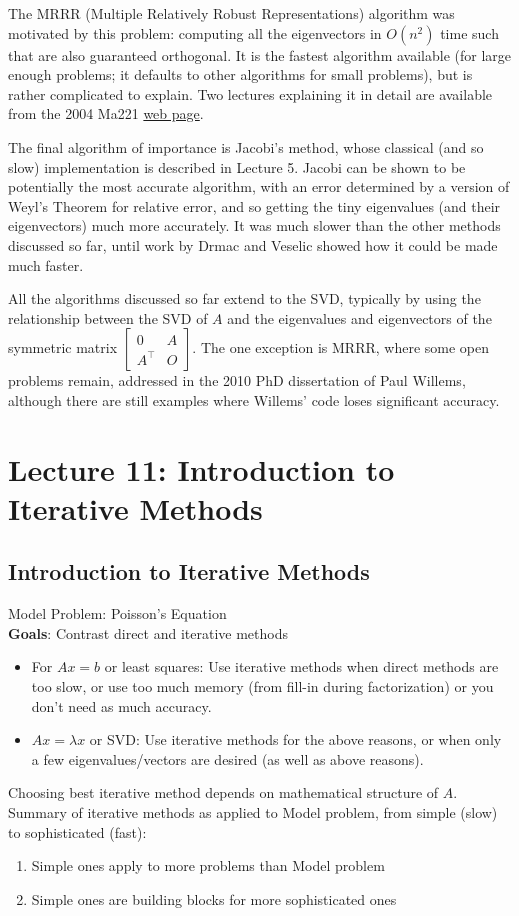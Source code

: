 \documentclass[11pt]{article}
\numberwithin{equation}{section}
\begin{document}
The MRRR (Multiple Relatively Robust Representations) algorithm was motivated by this problem: computing all the eigenvectors in $O(n^2)$ 
time such that are also guaranteed orthogonal. It is the fastest algorithm available (for large enough problems; it defaults to other algorithms for small problems), 
but is rather complicated to explain. Two lectures explaining it in detail are available from the 2004 Ma221 \href{https://people.eecs.berkeley.edu/~demmel/ma221_Fall04/}{web page}.

The final algorithm of importance is Jacobi's method, whose classical (and so slow) implementation is described in Lecture 5.
Jacobi can be shown to be potentially the most accurate algorithm, with an error determined by a version of Weyl's Theorem for relative error,
and so getting the tiny eigenvalues (and their eigenvectors) much more accurately. It was much slower than the other methods discussed so far, 
until work by Drmac and Veselic showed how it could be made much faster.

All the algorithms discussed so far extend to the SVD, typically by using the relationship between the SVD of $A$ and the eigenvalues and eigenvectors of the
symmetric matrix $\left[\begin{array}{cc}
    0 & A\\
    A^{\top} & O
    \end{array}\right]$. The one exception is MRRR, where some open problems remain, addressed in the 2010 PhD dissertation of Paul Willems,
although there are still examples where Willems’ code loses significant accuracy.

\newpage
\section{Lecture 11: Introduction to Iterative Methods}
\subsection{Introduction to Iterative Methods}
Model Problem: Poisson's Equation \\
\textbf{Goals}: Contrast direct and iterative methods
\begin{itemize}
    \item For $Ax=b$ or least squares: Use iterative methods when direct methods
    are too slow, or use too much memory (from fill-in during factorization) or you don't need as much accuracy.
    \item  $Ax=\lambda x$ or SVD: Use iterative methods for the above reasons, or when only a few eigenvalues/vectors are desired (as well as above reasons).
\end{itemize}
Choosing best iterative method depends on mathematical structure of $A$.
Summary of iterative methods as applied to Model problem, from simple (slow) to sophisticated (fast):
\begin{enumerate}
    \item Simple ones apply to more problems than Model problem
    \item Simple ones are building blocks for more sophisticated ones
\end{enumerate}
\end{document}
